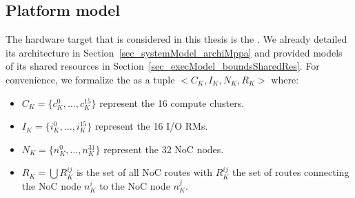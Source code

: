 \documentclass[main.tex]{subfiles}
\begin{document}
\subsection{Platform model}
\label{ssec_framework_hwModel}
The hardware target that is considered in this thesis is the \mppalong. We already detailed its architecture in Section~\ref{sec_systemModel_archiMppa} and provided models of its shared resources in Section~\ref{sec_execModel_boundsSharedRes}. For convenience, we formalize the \mppalong as a tuple 
$< C_K , I_K , N_K, R_K >$ where:
\begin{itemize}
    \item $C_K = \{ c_K^0 , \ldots , c_K^{15} \}$ represent the 16 compute clusters.
    \item $I_K = \{ i_K^0 , \ldots , i_K^{15} \}$ represent the 16 I/O RMs.
    \item $N_K = \{ n_K^0 , \ldots , n_K^{31} \}$ represent the 32 NoC nodes.
    \item $R_K = \bigcup R_K^{ij}$ is the set of all NoC routes with $R_K^{ij}$ the set of routes connecting the NoC node $n_K^i$ to the NoC node $n_K^j$.
\end{itemize}
\end{document}
